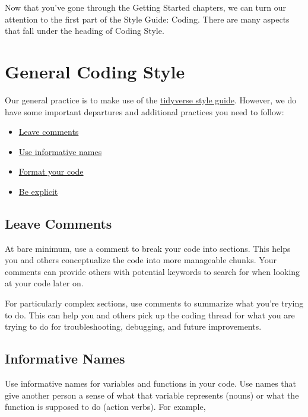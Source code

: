 \documentclass[
]{book}
\providecommand{\tightlist}{%
  \setlength{\itemsep}{0pt}\setlength{\parskip}{0pt}}
\begin{document}
Now that you've gone through the Getting Started chapters, we can turn our attention to the first part of the Style Guide: Coding. There are many aspects that fall under the heading of Coding Style.

\hypertarget{genCodec}{%
\section{General Coding Style}\label{genCodec}}

Our general practice is to make use of the \href{https://style.tidyverse.org/}{tidyverse style guide}. However, we do have some important departures and additional practices you need to follow:

\begin{itemize}
\tightlist
\item
  \protect\hyperlink{commentsc}{Leave comments}
\item
  \protect\hyperlink{namingc}{Use informative names}
\item
  \protect\hyperlink{formatCodec}{Format your code}
\item
  \protect\hyperlink{explicitc}{Be explicit}
\end{itemize}

\hypertarget{commentsc}{%
\subsection{Leave Comments}\label{commentsc}}

At bare minimum, use a comment to break your code into sections. This helps you and others conceptualize the code into more manageable chunks. Your comments can provide others with potential keywords to search for when looking at your code later on.

For particularly complex sections, use comments to summarize what you're trying to do. This can help you and others pick up the coding thread for what you are trying to do for troubleshooting, debugging, and future improvements.

\hypertarget{namingc}{%
\subsection{Informative Names}\label{namingc}}

Use informative names for variables and functions in your code. Use names that give another person a sense of what that variable represents (nouns) or what the function is supposed to do (action verbs). For example,
\end{document}

